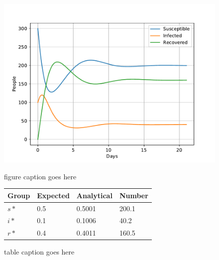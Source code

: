 \documentclass[a4paper]{article}
\begin{document}
\begin{figure}
	\centering
	\begin{minipage}{0.49\textwidth}
		\centering
		\includegraphics[scale=0.6]{../plots/opp_a_B.pdf}
		\caption{figure caption goes here}\label{fig:opp_a_B}
	\end{minipage}
	\begin{minipage}{0.49\textwidth}
		\centering
		\captionsetup{type=table} %
		\begin{tabular}{|l|l|l|l|}
			\hline
			Group & Expected & Analytical   & Number  \\ \hline
			$s*$ & 0.5 & 0.5001 & 200.1 \\ \hline
			$i*$ & 0.1 & 0.1006 & 40.2 \\ \hline
			$r*$ & 0.4 & 0.4011 & 160.5 \\ \hline
		\end{tabular}
		\caption{table caption goes  here}\label{tab:opp_a_B}
	\end{minipage}
\end{figure}
\end{document}
